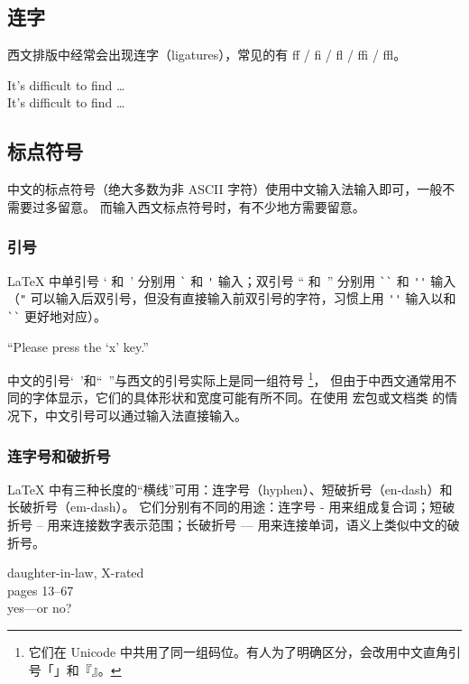 \subsection{连字}\label{subsec:ligatures}

西文排版中经常会出现连字（ligatures），常见的有 ff / fi / fl / ffi / ffl{}。
\begin{example}
It's difficult to find \ldots\\
It's dif{}f{}icult to f{}ind \ldots
\end{example}

\subsection{标点符号}\label{subsec:punct}

中文的标点符号（绝大多数为非 ASCII 字符）使用中文输入法输入即可，一般不需要过多留意。
而输入西文标点符号时，有不少地方需要留意。

\subsubsection{引号}

\LaTeX{} 中单引号 ` 和\ ' 分别用 \verb|`| 和 \verb|'| 输入；双引号 `` 和\ '' 分别用 \verb|``| 和 \verb|''| 输入
（\verb|"| 可以输入后双引号，但没有直接输入前双引号的字符，习惯上用 \verb|''| 输入以和 \verb|``| 更好地对应）。
\begin{example}
``Please press the `x' key.''
\end{example}

中文的引号‘~’和“~”与西文的引号实际上是同一组符号%
\footnote{它们在 Unicode 中共用了同一组码位。有人为了明确区分，会改用中文直角引号「」和『』。}，
但由于中西文通常用不同的字体显示，它们的具体形状和宽度可能有所不同。在使用  宏包或文档类
的情况下，中文引号可以通过输入法直接输入。

\subsubsection{连字号和破折号}

\LaTeX{} 中有三种长度的“横线”可用：连字号（hyphen）、短破折号（en-dash）和长破折号（em-dash）。
它们分别有不同的用途：连字号 - 用来组成复合词；短破折号 -- 用来连接数字表示范围；长破折号 --- 用来连接单词，语义上类似中文的破折号。
\begin{example}
daughter-in-law, X-rated\\
pages 13--67\\
yes---or no?
\end{example}

